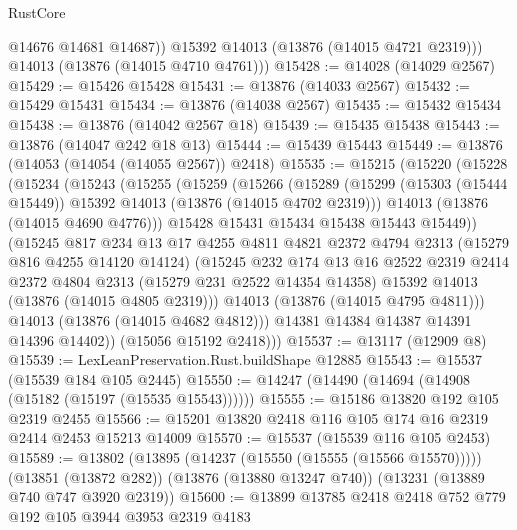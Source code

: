 \begin{lexlean}{RustCore}
\begin{coremodule}
            @14676
            @14681
            @14687))
        @15392
        @14013
        (@13876 (@14015 @4721 @2319)))
      @14013
      (@13876 (@14015 @4710 @4761)))
@15428 := @14028 (@14029 @2567)
@15429 := @15426 @15428
@15431 := @13876 (@14033 @2567)
@15432 := @15429 @15431
@15434 := @13876 (@14038 @2567)
@15435 := @15432 @15434
@15438 := @13876 (@14042 @2567 @18)
@15439 := @15435 @15438
@15443 := @13876 (@14047 @242 @18 @13)
@15444 := @15439 @15443
@15449 := @13876 (@14053 (@14054 (@14055 @2567)) @2418)
@15535 := @15215
    (@15220
      (@15228
        (@15234
          (@15243
            (@15255
              (@15259
                (@15266
                  (@15289
                    (@15299 (@15303 (@15444 @15449)) @15392 @14013 (@13876 (@14015 @4702 @2319)))
                    @14013
                    (@13876 (@14015 @4690 @4776)))
                  @15428
                  @15431
                  @15434
                  @15438
                  @15443
                  @15449))
              (@15245
                @817
                @234
                @13
                @17
                @4255
                @4811
                @4821
                @2372
                @4794
                @2313
                (@15279 @816 @4255 @14120 @14124)
                (@15245
                  @232
                  @174
                  @13
                  @16
                  @2522
                  @2319
                  @2414
                  @2372
                  @4804
                  @2313
                  (@15279 @231 @2522 @14354 @14358)
                  @15392
                  @14013
                  (@13876 (@14015 @4805 @2319)))
                @14013
                (@13876 (@14015 @4795 @4811)))
              @14013
              (@13876 (@14015 @4682 @4812)))
            @14381
            @14384
            @14387
            @14391
            @14396
            @14402))
        (@15056 @15192 @2418)))
@15537 := @13117 (@12909 @8)
@15539 := LexLeanPreservation.Rust.buildShape @12885
@15543 := @15537 (@15539 @184 @105 @2445)
@15550 := @14247 (@14490 (@14694 (@14908 (@15182 (@15197 (@15535 @15543))))))
@15555 := @15186 @13820 @192 @105 @2319 @2455
@15566 := @15201 @13820 @2418 @116 @105 @174 @16 @2319 @2414 @2453 @15213 @14009
@15570 := @15537 (@15539 @116 @105 @2453)
@15589 := @13802
    (@13895 (@14237 (@15550 (@15555 (@15566 @15570)))))
    (@13851 (@13872 @282))
    (@13876 (@13880 @13247 @740))
    (@13231 (@13889 @740 @747 @3920 @2319))
@15600 := @13899 @13785 @2418 @2418 @752 @779 @192 @105 @3944 @3953 @2319 @4183

\end{coremodule}
\end{lexlean}
